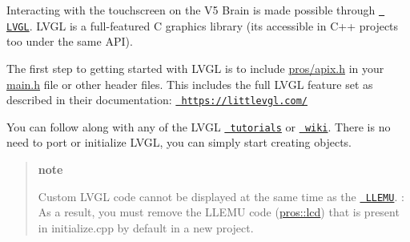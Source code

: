 Interacting with the touchscreen on the V5 Brain is made possible through \href{https://littlevgl.com}{\texttt{ L\+V\+GL}}. L\+V\+GL is a full-\/featured C graphics library (it\textquotesingle{}s accessible in C++ projects too under the same A\+PI).

The first step to getting started with L\+V\+GL is to include {\ttfamily \mbox{\hyperlink{apix_8h}{pros/apix.\+h}}} in your {\ttfamily \mbox{\hyperlink{main_8h}{main.\+h}}} file or other header files. This includes the full L\+V\+GL feature set as described in their documentation\+: \href{https://littlevgl.com/}{\texttt{ https\+://littlevgl.\+com/}}

You can follow along with any of the L\+V\+GL \href{https://github.com/littlevgl/lv_examples/tree/master/lv_tutorial}{\texttt{ tutorials}} or \href{https://docs.littlevgl.com/\#Objects}{\texttt{ wiki}}. There is no need to port or initialize L\+V\+GL, you can simply start creating objects.

\begin{quote}
{\bfseries{note}}

Custom L\+V\+GL code cannot be displayed at the same time as the \href{./llemu.html}{\texttt{ L\+L\+E\+MU}}. \+: As a result, you must remove the L\+L\+E\+MU code ({\ttfamily \mbox{\hyperlink{namespacepros_1_1lcd}{pros\+::lcd}}}) that is present in {\ttfamily initialize.\+cpp} by default in a new project. \end{quote}
